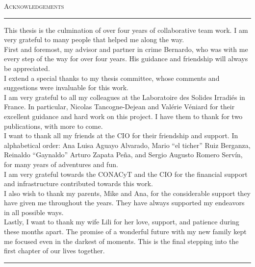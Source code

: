 \null
\vfill

\begin{center}

{\LARGE{\scshape Acknowledgements}}\\

\noindent\rule[2pt]{0.85\textwidth}{0.5pt}

\parbox{0.85\textwidth}{
This thesis is the culmination of over four years of collaborative team work. I
am very grateful to many people that helped me along the way.\\

First and foremost, my advisor and partner in crime Bernardo, who was with me
every step of the way for over four years. His guidance and friendship will
always be appreciated.\\

I extend a special thanks to my thesis committee, whose comments and suggestions
were invaluable for this work.\\

I am very grateful to all my colleagues at the Laboratoire des Solides
Irradi\'es in France. In particular, Nicolas Tancogne-Dejean and Val\'erie
V\'eniard for their excellent guidance and hard work on this project. I have
them to thank for two publications, with more to come.\\

I want to thank all my friends at the CIO for their friendship and support. In
alphabetical order: Ana Luisa Aguayo Alvarado, Mario ``el ticher'' Ruiz
Berganza, Reinaldo ``Gaynaldo'' Arturo Zapata Pe\~na, and Sergio Augusto Romero
Serv\'in, for many years of adventures and fun.\\

I am very grateful towards the CONACyT and the CIO for the financial support and
infrastructure contributed towards this work.\\

I also wish to thank my parents, Mike and Ana, for the considerable support they
have given me throughout the years. They have always supported my endeavors in
all possible ways.\\

Lastly, I want to thank my wife Lili for her love, support, and patience during
these months apart. The promise of a wonderful future with my new family kept me
focused even in the darkest of moments. This is the final stepping into the
first chapter of our lives together.}

\noindent\rule[2pt]{0.85\textwidth}{0.5pt}

\end{center}

\vfill

\cleardoublepage
